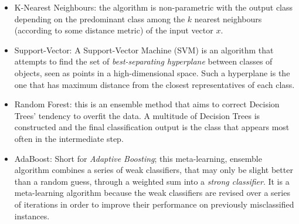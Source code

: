\begin{itemize}
  \item K-Nearest Neighbours: the algorithm is non-parametric with the output class depending on the predominant class among the $k$ nearest neighbours (according to some distance metric) of the input vector $x$.
  \item Support-Vector: A Support-Vector Machine (SVM) is an algorithm that attempts to find the set of \textit{best-separating hyperplane} between classes of objects, seen as points in a high-dimensional space.  Such a hyperplane is the one that has maximum distance from the closest representatives of each class.
  \item Random Forest: this is an ensemble method that aims to correct Decision Trees' tendency to overfit the data.  A multitude of Decision Trees is constructed and the final classification output is the class that appears most often in the intermediate step.
  \item AdaBoost: Short for \textit{Adaptive Boosting}; this meta-learning, ensemble algorithm combines a series of weak classifiers, that may only be slight better than a random guess, through a weighted sum into a \textit{strong classifier}.  It is a meta-learning algorithm because the weak classifiers are revised over a series of iterations in order to improve their performance on previously misclassified instances.
  \end{itemize}



